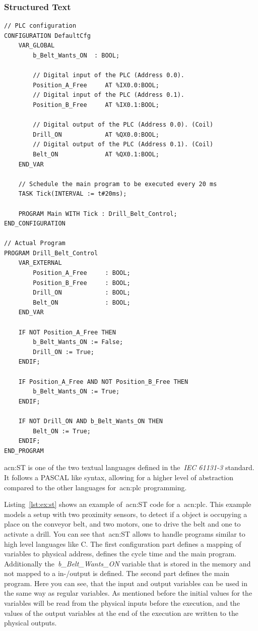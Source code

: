 \subsubsection{Structured Text}
\lstset{language=Pascal}
\begin{lstlisting}[caption={
Example of~\gls{acn:ST} code for controlling a converyor belt and a drill.},label=lst:ex:st]
// PLC configuration
CONFIGURATION DefaultCfg
	VAR_GLOBAL
		b_Belt_Wants_ON  : BOOL;

		// Digital input of the PLC (Address 0.0).
		Position_A_Free     AT %IX0.0:BOOL;
		// Digital input of the PLC (Address 0.1).
		Position_B_Free     AT %IX0.1:BOOL;

		// Digital output of the PLC (Address 0.0). (Coil)
		Drill_ON            AT %QX0.0:BOOL;
		// Digital output of the PLC (Address 0.1). (Coil)
		Belt_ON             AT %QX0.1:BOOL;
	END_VAR

	// Schedule the main program to be executed every 20 ms
	TASK Tick(INTERVAL := t#20ms);

	PROGRAM Main WITH Tick : Drill_Belt_Control;
END_CONFIGURATION

// Actual Program
PROGRAM Drill_Belt_Control          
	VAR_EXTERNAL
		Position_A_Free     : BOOL;
		Position_B_Free     : BOOL;
		Drill_ON            : BOOL;
		Belt_ON             : BOOL;
	END_VAR

	IF NOT Position_A_Free THEN
		b_Belt_Wants_ON := False;
		Drill_ON := True;
	ENDIF;

	IF Position_A_Free AND NOT Position_B_Free THEN
		b_Belt_Wants_ON := True;
	ENDIF;

	IF NOT Drill_ON AND b_Belt_Wants_ON THEN
		Belt_ON := True;
	ENDIF;
END_PROGRAM
\end{lstlisting}

\acrfull{acn:ST} is one of the two textual languages defined in the~\textit{IEC 61131-3} standard.
It follows a PASCAL like syntax, allowing for a higher level of abstraction compared to the other languages for~\acrshort{acn:plc} programming.

Listing~\ref{lst:ex:st} shows an example of~\acrshort{acn:ST} code for a~\acrshort{acn:plc}.
This example models a setup with two proximity sensors, to detect if a object is occupying a place on the conveyor belt, and two motors, one to drive the belt and one to activate a drill.
You can see that~\acrshort{acn:ST} allows to handle programs similar to high level languages like C.
The first configuration part defines a mapping of variables to physical address, defines the cycle time and the main program.
Additionally the~\textit{b\_Belt\_Wants\_ON} variable that is stored in the memory and not mapped to a in-/output is defined.
The second part defines the main program.
Here you can see, that the input and output variables can be used in the same way as regular variables.
As mentioned before the initial values for the variables will be read from the physical inputs before the execution, and the values of the output variables at the end of the execution are written to the physical outputs.

